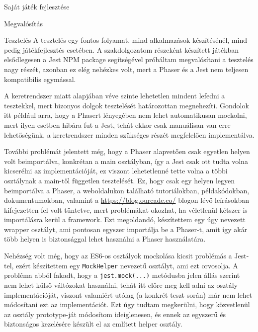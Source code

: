 \begin{MyChapter}{Saját játék fejlesztése}
\begin{MySection}{Megvalósítás}
	\end{MySection}
		
	\begin{MySection}{Tesztelés}
		A tesztelés egy fontos folyamat, mind alkalmazások készítésénél, mind pedig játékfejlesztés esetében. 
		A szakdolgozatom részeként készített játékban elsődlegesen a Jest NPM package segítségével próbáltam megvalósítani a tesztelés nagy részét, azonban ez elég nehézkes volt, mert a Phaser és a Jest nem teljesen kompatibilis egymással.
				
		
		A keretrendszer miatt alapjában véve szinte lehetetlen mindent lefedni a tesztekkel, mert bizonyos dolgok tesztelését határozottan megnehezíti.
		Gondolok itt például arra, hogy a Phasert lényegében nem lehet automatikusan mockolni, mert ilyen esetben hibára fut a Jest, tehát ekkor csak manuálisan van erre lehetőségünk, a keretrendszer minden szükséges részét megfelelően implementálva.
		
		További problémát jelentett még, hogy a Phaser alapvetően csak egyetlen helyen volt beimportálva, konkrétan a main osztályban, így a Jest csak ott tudta volna kicserélni az implementációját, ez viszont lehetetlenné tette volna a többi osztálynak a main-től független tesztelését. Ez, hogy csak egy helyen legyen beimportálva a Phaser, a weboldalukon \cite{phaser_official_website} található tutoriálokban, példakódokban, dokumentumokban, valamint a \url{https://blog.ourcade.co/} blogon lévő leírásokban kifejezetten fel volt tüntetve, mert problémákat okozhat, ha véletlenül kétszer is importálásra kerül a framework. Ezt megoldandó, készítettem egy úgy nevezett wrapper osztályt, ami pontosan egyszer importálja be a Phaser-t, amit így akár több helyen is biztonsággal lehet használni a Phaser használatára.
		
			
		Nehézség volt még, hogy az ES6-os osztályok mockolása kicsit problémás a Jest-tel, ezért készítettem egy \texttt{MockHelper} nevezetű osztályt, ami ezt orvosolja. A probléma abból fakadt, hogy a \texttt{jest.mock(...)} metódusba jelen állás szerint nem lehet külső váltózokat használni, tehát itt előre meg kell adni az osztály implementációját, viszont valamiért utólag (a konkrét teszt során) már nem lehet módosítani ezt az implementációt. Ezt úgy tudtam megkerülni, hogy közvetlenül az osztály prototype-ját módosítom ideiglenesen, és ennek az egyszerű és biztonságos kezelésére készült el az említett helper osztály.		


\end{MySection}
\end{MyChapter}
